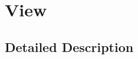 \hypertarget{group____view}{\section{View}
\label{group____view}
}


\subsection{Detailed Description}
